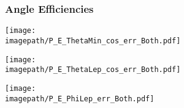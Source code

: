 
\begin{frame}\frametitle{Angle Efficiencies }

    \begin{minipage}{0.32\textwidth}
        \centering
        \texttt{[image: \\imagepath/P\_E\_ThetaMin\_cos\_err\_Both.pdf]}
    \end{minipage}
    \begin{minipage}{0.32\textwidth}
        \centering
        \texttt{[image: \\imagepath/P\_E\_ThetaLep\_cos\_err\_Both.pdf]}
    \end{minipage}
    \begin{minipage}{0.32\textwidth}
        \centering
        \texttt{[image: \\imagepath/P\_E\_PhiLep\_err\_Both.pdf]}
    \end{minipage}

\end{frame}

\appendix

